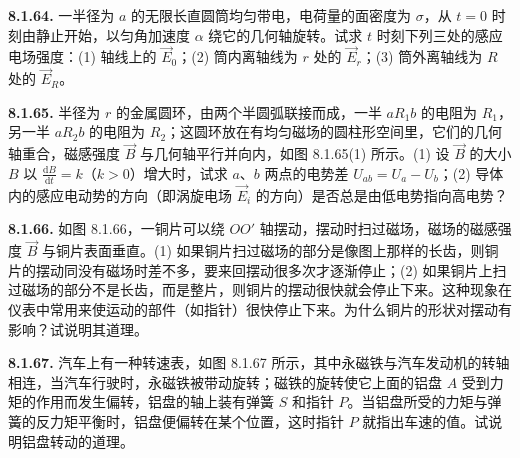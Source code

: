 \begin{center}
\end{center}

\vfill
\newpage

\textbf{8.1.64.} 一半径为 $a$ 的无限长直圆筒均匀带电，电荷量的面密度为 $\sigma$，从 $t = 0$ 时刻由静止开始，以匀角加速度 $\alpha$ 绕它的几何轴旋转。试求 $t$ 时刻下列三处的感应电场强度：(1) 轴线上的 $\vec{E}_0$；(2) 筒内离轴线为 $r$ 处的 $\vec{E}_r$；(3) 筒外离轴线为 $R$ 处的 $\vec{E}_R$。

\vfill
\newpage

\textbf{8.1.65.} 半径为 $r$ 的金属圆环，由两个半圆弧联接而成，一半 $aR_{1}b$ 的电阻为 $R_{1}$，另一半 $aR_{2}b$ 的电阻为 $R_{2}$；这圆环放在有均匀磁场的圆柱形空间里，它们的几何轴重合，磁感强度 $\vec{B}$ 与几何轴平行并向内，如图 8.1.65(1) 所示。(1) 设 $\vec{B}$ 的大小 $B$ 以 $\displaystyle \frac{\mathrm{d}B}{\mathrm{d}t} = k$（$k > 0$）增大时，试求 $a$、$b$ 两点的电势差 $U_{ab} = U_{a} - U_{b}$；(2) 导体内的感应电动势的方向（即涡旋电场 $\vec{E}_{i}$ 的方向）是否总是由低电势指向高电势？

\begin{center}
\end{center}

\vfill
\newpage

\textbf{8.1.66.} 如图 8.1.66，一铜片可以绕 $OO'$ 轴摆动，摆动时扫过磁场，磁场的磁感强度 $\vec{B}$ 与铜片表面垂直。(1) 如果铜片扫过磁场的部分是像图上那样的长齿，则铜片的摆动同没有磁场时差不多，要来回摆动很多次才逐渐停止；(2) 如果铜片上扫过磁场的部分不是长齿，而是整片，则铜片的摆动很快就会停止下来。这种现象在仪表中常用来使运动的部件（如指针）很快停止下来。为什么铜片的形状对摆动有影响？试说明其道理。

\begin{center}
\end{center}

\vfill
\newpage

\textbf{8.1.67.} 汽车上有一种转速表，如图 8.1.67 所示，其中永磁铁与汽车发动机的转轴相连，当汽车行驶时，永磁铁被带动旋转；磁铁的旋转使它上面的铝盘 $A$ 受到力矩的作用而发生偏转，铝盘的轴上装有弹簧 $S$ 和指针 $P$。当铝盘所受的力矩与弹簧的反力矩平衡时，铝盘便偏转在某个位置，这时指针 $P$ 就指出车速的值。试说明铝盘转动的道理。

\begin{center}
\end{center}

